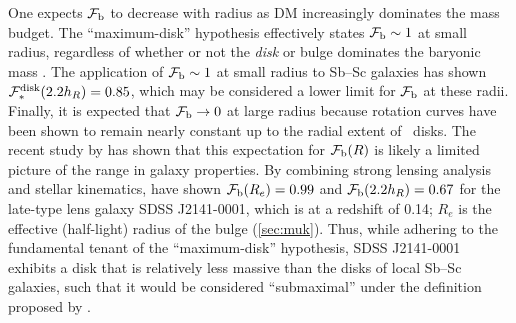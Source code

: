 \documentclass[apj,iop,numberedappendix]{emulateapj}
\begin{document}
One expects $\mathcal{F}_{\rm b}$ to decrease with radius as DM increasingly dominates the
mass budget.  The ``maximum-disk'' hypothesis effectively states $\mathcal{F}_{\rm b}\sim 1$
at small radius, regardless of whether or not the {\it disk} or bulge dominates the
baryonic mass \citep[see the implementation of the ``maximum-disk'' hypothesis
by, e.g.,][]{1986AJ.....91.1301K, 1987AJ.....93..816K}.  The application of
$\mathcal{F}_{\rm b}\sim 1$ at small radius to Sb--Sc galaxies has shown $\mathcal{F}_{\ast}^{\rm disk} (2.2 h_R) =
0.85$, which may be considered a lower limit for $\mathcal{F}_{\rm b}$ at these radii.
Finally, it is expected that $\mathcal{F}_{\rm b}\to 0$ at large radius because rotation curves
have been shown to remain nearly constant up to the radial extent of \hone\
disks.  The recent study by \citet{2011arXiv1101.1622D} has shown that this
expectation for $\mathcal{F}_{\rm b}(R)$ is likely a limited picture of the range in galaxy
properties.  By combining strong lensing analysis and stellar kinematics,
\citeauthor{2011arXiv1101.1622D} have shown $\mathcal{F}_{\rm b}(R_e) = 0.99$ and
$\mathcal{F}_{\rm b}(2.2h_R) = 0.67$ for the late-type lens galaxy SDSS J2141-0001, which is
at a redshift of 0.14; $R_e$ is the effective (half-light) radius of the bulge
(\sect \ref{sec:muk}).  Thus, while adhering to the fundamental tenant of the
``maximum-disk'' hypothesis, SDSS J2141-0001 exhibits a disk that is relatively
less massive than the disks of local Sb--Sc galaxies, such that it would be
considered ``submaximal'' under the definition proposed by
\citet{1997ApJ...483..103S}.
\end{document}
